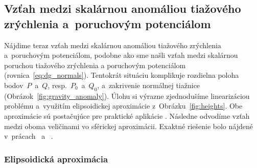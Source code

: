 \documentclass[a4paper, 12pt]{book}
\begin{document}
\subsection{Vzťah medzi skalárnou anomáliou tiažového zrýchlenia a~poruchovým 
potenciálom}

Nájdime teraz vzťah medzi skalárnou anomáliou tiažového zrýchlenia a~poruchovým 
potenciálom, podobne ako sme našli vzťah medzi skalárnou poruchou tiažového 
zrýchlenia a poruchovým potenciálom (rovnica~\ref{eq:dg_normals}).  Tentokrát 
situáciu komplikuje rozdielna poloha bodov~$P$~a~$Q$, resp.~$P_0$~a~$Q_0$, 
a~zakrivenie normálnej tiažnice (Obrázok~\ref{fig:gravity_anomaly}).  Úlohu si 
výrazne zjednodušíme linearizáciou problému a~využitím elipsoidickej 
aproximácie z~Obrázku~\ref{fig:heights}.  Obe aproximácie sú postačujúce pre 
praktické aplikácie \parencite{MoritzAdvancedGeodesy}.  Následne odvodíme vzťah 
medzi oboma veličinami vo sférickej aproximácii.  Exaktné riešenie bolo nájdené 
v~prácach~\textcite{Meissl1971b} a~\textcite{Borre_chapter8} \parencite[pozri 
tiež napríklad][]{MoritzAdvancedGeodesy,Janak2006}.

\subsubsection{Elipsoidická aproximácia}
\end{document}

